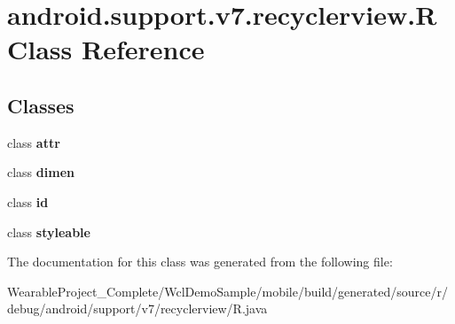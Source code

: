 \hypertarget{classandroid_1_1support_1_1v7_1_1recyclerview_1_1R}{}\section{android.\+support.\+v7.\+recyclerview.\+R Class Reference}
\label{classandroid_1_1support_1_1v7_1_1recyclerview_1_1R}
\subsection*{Classes}
\begin{DoxyCompactItemize}
\item 
class {\bfseries attr}
\item 
class {\bfseries dimen}
\item 
class {\bfseries id}
\item 
class {\bfseries styleable}
\end{DoxyCompactItemize}


The documentation for this class was generated from the following file\+:\begin{DoxyCompactItemize}
\item 
Wearable\+Project\+\_\+\+Complete/\+Wcl\+Demo\+Sample/mobile/build/generated/source/r/debug/android/support/v7/recyclerview/R.\+java\end{DoxyCompactItemize}
